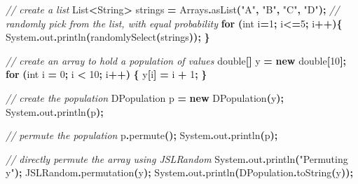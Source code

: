 \documentclass[
]{book}
\newenvironment{Shaded}{\begin{snugshade}}{\end{snugshade}}
\newcommand{\BuiltInTok}[1]{#1}
\newcommand{\CommentTok}[1]{\textcolor[rgb]{0.56,0.35,0.01}{\textit{#1}}}
\newcommand{\ControlFlowTok}[1]{\textcolor[rgb]{0.13,0.29,0.53}{\textbf{#1}}}
\newcommand{\DataTypeTok}[1]{\textcolor[rgb]{0.13,0.29,0.53}{#1}}
\newcommand{\DecValTok}[1]{\textcolor[rgb]{0.00,0.00,0.81}{#1}}
\newcommand{\FunctionTok}[1]{\textcolor[rgb]{0.00,0.00,0.00}{#1}}
\newcommand{\KeywordTok}[1]{\textcolor[rgb]{0.13,0.29,0.53}{\textbf{#1}}}
\newcommand{\NormalTok}[1]{#1}
\newcommand{\OperatorTok}[1]{\textcolor[rgb]{0.81,0.36,0.00}{\textbf{#1}}}
\newcommand{\StringTok}[1]{\textcolor[rgb]{0.31,0.60,0.02}{#1}}
\theoremstyle{definition}
\theoremstyle{definition}
\theoremstyle{definition}
\theoremstyle{definition}
\theoremstyle{remark}
\begin{document}
\begin{Shaded}
\begin{Highlighting}[]
\CommentTok{// create a list}
\BuiltInTok{List}\OperatorTok{\textless{}}\BuiltInTok{String}\OperatorTok{\textgreater{}}\NormalTok{ strings }\OperatorTok{=} \BuiltInTok{Arrays}\OperatorTok{.}\FunctionTok{asList}\OperatorTok{(}\StringTok{"A"}\OperatorTok{,} \StringTok{"B"}\OperatorTok{,} \StringTok{"C"}\OperatorTok{,} \StringTok{"D"}\OperatorTok{);}
\CommentTok{// randomly pick from the list, with equal probability}
\ControlFlowTok{for} \OperatorTok{(}\DataTypeTok{int}\NormalTok{ i}\OperatorTok{=}\DecValTok{1}\OperatorTok{;}\NormalTok{ i}\OperatorTok{\textless{}=}\DecValTok{5}\OperatorTok{;}\NormalTok{ i}\OperatorTok{++)\{}
    \BuiltInTok{System}\OperatorTok{.}\FunctionTok{out}\OperatorTok{.}\FunctionTok{println}\OperatorTok{(}\FunctionTok{randomlySelect}\OperatorTok{(}\NormalTok{strings}\OperatorTok{));}
\OperatorTok{\}}

\CommentTok{// create an array to hold a population of values}
\DataTypeTok{double}\OperatorTok{[]}\NormalTok{ y }\OperatorTok{=} \KeywordTok{new} \DataTypeTok{double}\OperatorTok{[}\DecValTok{10}\OperatorTok{];}
\ControlFlowTok{for} \OperatorTok{(}\DataTypeTok{int}\NormalTok{ i }\OperatorTok{=} \DecValTok{0}\OperatorTok{;}\NormalTok{ i }\OperatorTok{\textless{}} \DecValTok{10}\OperatorTok{;}\NormalTok{ i}\OperatorTok{++)} \OperatorTok{\{}
\NormalTok{    y}\OperatorTok{[}\NormalTok{i}\OperatorTok{]} \OperatorTok{=}\NormalTok{ i }\OperatorTok{+} \DecValTok{1}\OperatorTok{;}
\OperatorTok{\}}

\CommentTok{// create the population}
\NormalTok{DPopulation p }\OperatorTok{=} \KeywordTok{new} \FunctionTok{DPopulation}\OperatorTok{(}\NormalTok{y}\OperatorTok{);}
\BuiltInTok{System}\OperatorTok{.}\FunctionTok{out}\OperatorTok{.}\FunctionTok{println}\OperatorTok{(}\NormalTok{p}\OperatorTok{);}

\CommentTok{// permute the population}
\NormalTok{p}\OperatorTok{.}\FunctionTok{permute}\OperatorTok{();}
\BuiltInTok{System}\OperatorTok{.}\FunctionTok{out}\OperatorTok{.}\FunctionTok{println}\OperatorTok{(}\NormalTok{p}\OperatorTok{);}

\CommentTok{// directly permute the array using JSLRandom}
\BuiltInTok{System}\OperatorTok{.}\FunctionTok{out}\OperatorTok{.}\FunctionTok{println}\OperatorTok{(}\StringTok{"Permuting y"}\OperatorTok{);}
\NormalTok{JSLRandom}\OperatorTok{.}\FunctionTok{permutation}\OperatorTok{(}\NormalTok{y}\OperatorTok{);}
\BuiltInTok{System}\OperatorTok{.}\FunctionTok{out}\OperatorTok{.}\FunctionTok{println}\OperatorTok{(}\NormalTok{DPopulation}\OperatorTok{.}\FunctionTok{toString}\OperatorTok{(}\NormalTok{y}\OperatorTok{));}


\end{Highlighting}
\end{Shaded}
\end{document}
